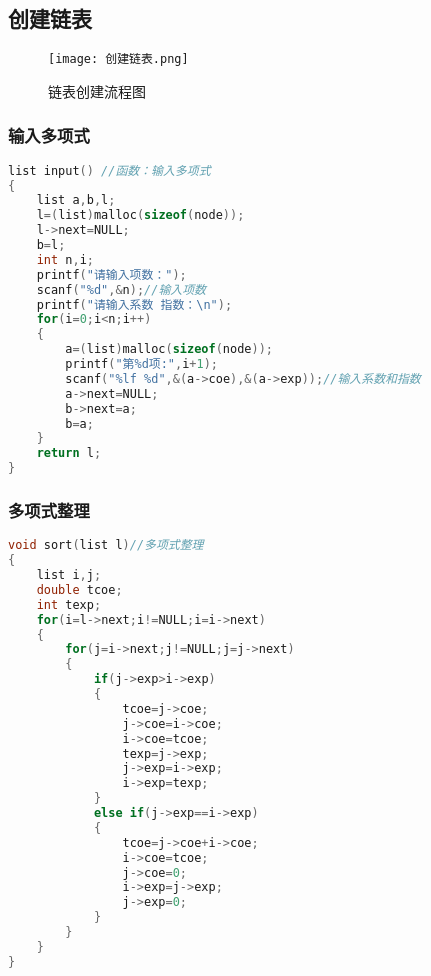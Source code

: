 \documentclass{DateStructure}
\begin{document}
\subsection{创建链表}
\begin{figure}[H]
\centering
\texttt{[image: 创建链表.png]}
\caption{链表创建流程图}
\end{figure}
\subsubsection{输入多项式}
\begin{lstlisting}[language=c,caption={input}]
list input() //函数：输入多项式
{
	list a,b,l;
	l=(list)malloc(sizeof(node));
	l->next=NULL;
	b=l;
	int n,i;
	printf("请输入项数：");
	scanf("%d",&n);//输入项数
	printf("请输入系数 指数：\n");
	for(i=0;i<n;i++)
	{
		a=(list)malloc(sizeof(node));
		printf("第%d项:",i+1);
		scanf("%lf %d",&(a->coe),&(a->exp));//输入系数和指数
		a->next=NULL;
		b->next=a;
		b=a;
	}
	return l;
}
\end{lstlisting}
\subsubsection{多项式整理}
\begin{lstlisting}[language=c,caption={sort}]
void sort(list l)//多项式整理
{
	list i,j;
	double tcoe;
	int texp;
	for(i=l->next;i!=NULL;i=i->next)
	{
		for(j=i->next;j!=NULL;j=j->next)
		{
			if(j->exp>i->exp)
			{
				tcoe=j->coe;
				j->coe=i->coe;
				i->coe=tcoe;
				texp=j->exp;
				j->exp=i->exp;
				i->exp=texp;
			}
			else if(j->exp==i->exp)
			{
				tcoe=j->coe+i->coe;
				i->coe=tcoe;
				j->coe=0;
				i->exp=j->exp;
				j->exp=0;
			}
		}
	}
}		
\end{lstlisting}
\end{document}
